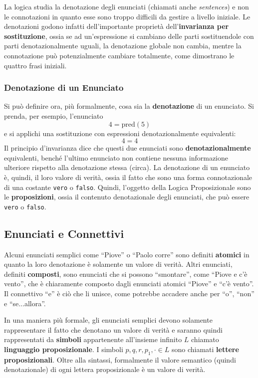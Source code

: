 La logica studia la denotazione degli enunciati (chiamati anche \textit{sentences}) e 
non le connotazioni in quanto esse sono troppo difficili da gestire a livello 
iniziale. Le denotazioni godono infatti dell'importante proprietà dell'\textbf{invarianza 
per sostituzione}, ossia se ad un'espressione si cambiano delle parti 
sostituendole con parti denotazionalmente uguali, la denotazione globale 
non cambia, mentre la connotazione può potenzialmente cambiare totalmente, 
come dimostrano le quattro frasi iniziali.

\subsubsection{Denotazione di un Enunciato}
Si può definire ora, più formalmente, cosa sia la \textbf{denotazione} di 
un enunciato. Si prenda, per esempio, l'enunciato
$$
4 = \text{pred}(5)
$$
e si applichi una sostituzione con espressioni denotazionalmente equivalenti: 
$$
4 = 4
$$
Il principio d'invarianza dice che questi due enunciati sono \textbf{denotazionalmente}
equivalenti, benché l'ultimo enunciato non contiene nessuna informazione 
ulteriore rispetto alla denotazione stessa (circa). La denotazione 
di un enunciato è, quindi, il loro valore di verità, ossia il fatto che sono 
una forma connotazionale di una costante \texttt{vero} o \texttt{falso}. 
Quindi, l'oggetto della Logica Proposizionale sono le \textbf{proposizioni}, 
ossia il contenuto denotazionale degli enunciati, che può essere 
\texttt{vero} o \texttt{falso}. 

\subsection{Enunciati e Connettivi}
Alcuni enunciati semplici come ``Piove'' o ``Paolo corre'' sono definiti 
\textbf{atomici} in quanto la loro denotazione è solamente un valore di 
verità. Altri enunciati, definiti \textbf{composti}, sono enunciati che si possono
``smontare'', come ``Piove e c'è vento'', che è chiaramente composto 
dagli enunciati atomici ``Piove'' e ``c'è vento''. Il connettivo ``e'' è 
ciò che li unisce, come potrebbe accadere anche per ``o'', ``non'' 
e ``se...allora''. 

In una maniera più formale, gli enunciati semplici 
devono solamente rappresentare il fatto che denotano un valore di verità e 
saranno quindi rappresentati da \textbf{simboli} appartenente all'insieme infinito
$L$ chiamato \textbf{linguaggio proposizionale}. I simboli 
$p, q, r, p_1, \cdot \in L$ sono chiamati \textbf{lettere proposizionali}. 
Oltre alla sintassi, formalmente il valore semantico (quindi denotazionale) di ogni 
lettera proposizionale è un valore di verità. 

